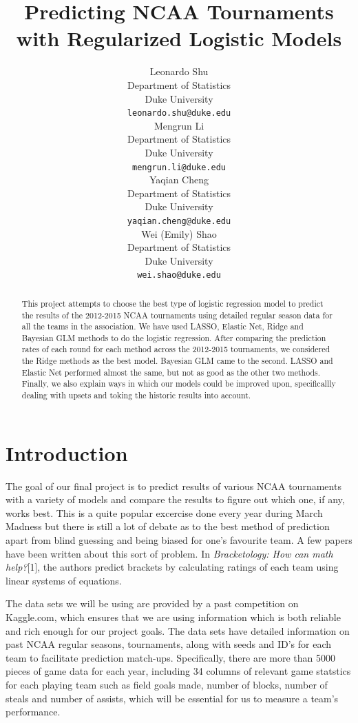 \documentclass{article} %
\title{Predicting NCAA Tournaments with Regularized Logistic Models}
\author{
  Leonardo Shu\\
  Department of Statistics\\
  Duke University\\
  \texttt{leonardo.shu@duke.edu} \\
  \And
  Mengrun Li \\
  Department of Statistics\\
  Duke University\\
  \texttt{mengrun.li@duke.edu} \\
  \AND
  Yaqian Cheng \\
  Department of Statistics\\
  Duke University\\
  \texttt{yaqian.cheng@duke.edu} \\
  \And
  Wei (Emily) Shao \\
  Department of Statistics\\
  Duke University\\
  \texttt{wei.shao@duke.edu} \\
}
\begin{document}
\maketitle

\begin{abstract}
This project attempts to choose the best type of logistic regression model to predict the results of the 2012-2015 NCAA tournaments using detailed regular season data for all the teams in the association.  We have used LASSO, Elastic Net, Ridge and Bayesian GLM methods to do the logistic regression. After comparing the prediction rates of each round for each method across the 2012-2015 tournaments, we considered the Ridge methods as the best model. Bayesian GLM came to the second. LASSO and Elastic Net performed almost the same, but not as good as the other two methods. Finally, we also explain ways in which our models could be improved upon, specificallly dealing with upsets and toking the historic results into account.
\end{abstract}

\section{Introduction}

The goal of our final project is to predict results of various NCAA tournaments with a variety of models and compare the results to figure out which one, if any, works best. This is a quite popular excercise done every year during March Madness but there is still a lot of debate as to the best method of prediction apart from blind guessing and being biased for one's favourite team. A few papers have been written about this sort of problem. In \textit{Bracketology: How can math help?}[1], the authors predict brackets by calculating ratings of each team using linear systems of equations.

The data sets we will be using are provided by a past competition on Kaggle.com, which ensures that we are using information which is both reliable and rich enough for our project goals. The data sets have detailed information on past NCAA regular seasons, tournaments, along with seeds and ID's for each team to facilitate prediction match-ups. Specifically, there are more than 5000 pieces of game data for each year, including 34 columns of relevant game statstics for each playing team such as field goals made, number of blocks, number of steals and number of assists, which will be essential for us to measure a team's performance.
\end{document}
